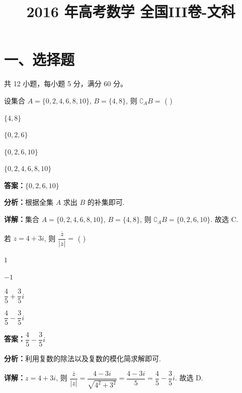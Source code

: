﻿\title{2016 年高考数学 全国III卷-文科}
\date{}
\maketitle

\section*{一、选择题}
共 12 小题，每小题 5 分，满分 60 分。

\begin{question}[points=5]
设集合 $A=\{0, 2, 4, 6, 8, 10\}$, $B=\{4, 8\}$, 则 $\complement_AB=$ ( )
\begin{choices}
  \item $\{4, 8\}$
  \item $\{0, 2, 6\}$
  \item $\{0, 2, 6, 10\}$
  \item $\{0, 2, 4, 6, 8, 10\}$
\end{choices}
\begin{solution}
\textbf{答案：}$\{0, 2, 6, 10\}$

\textbf{分析：}根据全集 $A$ 求出 $B$ 的补集即可.

\textbf{详解：}集合 $A=\{0, 2, 4, 6, 8, 10\}$, $B=\{4, 8\}$, 则 $\complement_AB=\{0, 2, 6, 10\}$. 故选 C.
\end{solution}
\end{question}

\begin{question}[points=5]
若 $z=4+3i$, 则 $\dfrac{\overline{z}}{|z|}=$ ( )
\begin{choices}
  \item $1$
  \item $-1$
  \item $\dfrac{4}{5}+\dfrac{3}{5}i$
  \item $\dfrac{4}{5}-\dfrac{3}{5}i$
\end{choices}
\begin{solution}
\textbf{答案：}$\dfrac{4}{5}-\dfrac{3}{5}i$

\textbf{分析：}利用复数的除法以及复数的模化简求解即可.

\textbf{详解：}$z=4+3i$, 则 $\dfrac{\overline{z}}{|z|}=\dfrac{4-3i}{\sqrt{4^2+3^2}}=\dfrac{4-3i}{5}=\dfrac{4}{5}-\dfrac{3}{5}i$. 故选 D.
\end{solution}
\end{question}

